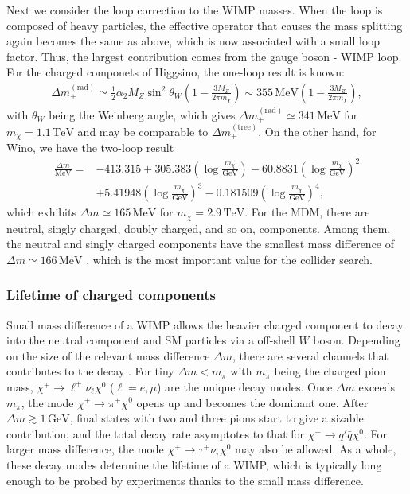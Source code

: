 \documentclass[12pt,twoside,book]{article}
\begin{document}
Next we consider the loop correction to the WIMP masses.
When the loop is composed of heavy particles, the effective operator that causes the mass splitting again becomes the same as above, which is now associated with a small loop factor.
Thus, the largest contribution comes from the gauge boson - WIMP loop.
For the charged componets of Higgsino, the one-loop result is known: \cite{Fukuda:2017jmk}
\begin{align}
  \Delta m_{+}^{\mathrm{(rad)}} \simeq \frac{1}{2} \alpha_2 M_Z \sin^2 \theta_W
  \left( 1 - \frac{3 M_Z}{2\pi m_\chi} \right)
  \sim 355\,\mathrm{MeV} \left( 1 - \frac{3 M_Z}{2\pi m_\chi} \right),
  \label{eq:Higgsino_delm_rad}
\end{align}
with $\theta_W$ being the Weinberg angle, which gives $\Delta m_{+}^{\mathrm{(rad)}} \simeq 341\,\mathrm{MeV}$ for $m_\chi = 1.1\,\mathrm{TeV}$ and may be comparable to $\Delta m_{+}^{\mathrm{(tree)}}$.
On the other hand, for Wino, we have the two-loop result \cite{Ibe:2012sx}
\newcommand{\logmchi}{\left( \log \frac{m_\chi}{\mathrm{GeV}} \right)}
\begin{align}
  \frac{\Delta m}{\mathrm{MeV}} =
  &-413.315 + 305.383 \logmchi - 60.8831 \logmchi^2\\
  &+ 5.41948 \logmchi^3 - 0.181509 \logmchi^4,
\end{align}
which exhibits $\Delta m \simeq 165\,\mathrm{MeV}$ for $m_\chi = 2.9\,\mathrm{TeV}$.
For the MDM, there are neutral, singly charged, doubly charged, and so on, components.
Among them, the neutral and singly charged components have the smallest mass difference of $\Delta m \simeq 166\, \mathrm{MeV}$ \cite{Cirelli:2005uq}, which is the most important value for the collider search.


\subsubsection*{Lifetime of charged components}

Small mass difference of a WIMP allows the heavier charged component to decay into the neutral component and SM particles via a off-shell $W$ boson.
Depending on the size of the relevant mass difference $\Delta m$, there are several channels that contributes to the decay \cite{Chen:1995yu}.
For tiny $\Delta m < m_\pi$ with $m_\pi$ being the charged pion mass, $\chi^{+} \to \ell^{+} \nu_\ell \chi^0$ ($\ell = e, \mu$) are the unique decay modes.
Once $\Delta m$ exceeds $m_\pi$, the mode $\chi^{+} \to \pi^{+} \chi^0$ opens up and becomes the dominant one.
After $\Delta m \gtrsim 1\, \mathrm{GeV}$, final states with two and three pions start to give a sizable contribution, and the total decay rate asymptotes to that for $\chi^{+} \to q' \bar{q} \chi^0$.
For larger mass difference, the mode $\chi^{+} \to \tau^{+} \nu_\tau \chi^0$ may also be allowed.
As a whole, these decay modes determine the lifetime of a WIMP, which is typically long enough to be probed by experiments thanks to the small mass difference.
\end{document}
